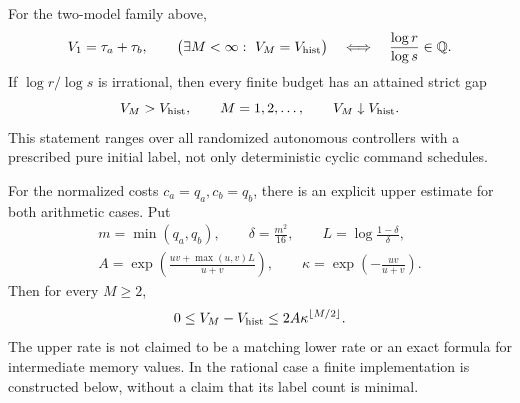 \begin{theorem}
\label{thm:r80-arithmetic-saturation}
For the two-model family above,
\[
 V_1=\tau_a+\tau_b,
 \qquad
 \bigl(\exists M<\infty:\ V_M=V_{\rm hist}\bigr)
       \quad\Longleftrightarrow\quad
                  \frac{\log r}{\log s}\in\mathbb Q.
\]
If $\log r/\log s$ is irrational, then every finite budget has
an attained strict gap
\begin{equation}\label{eq:r80-strict-all-memory}
 V_M>V_{\rm hist},\qquad M=1,2,\ldots,
 \qquad V_M\downarrow V_{\rm hist}.
\end{equation}
This statement ranges over all randomized autonomous controllers
with a prescribed pure initial label, not only deterministic
cyclic command schedules.

For the normalized costs $c_a=q_a,c_b=q_b$, there is an explicit
upper estimate for both arithmetic cases.  Put
\begin{gather*}
 m=\min(q_a,q_b),\qquad \delta=\frac{m^2}{16},\qquad
 L=\log\frac{1-\delta}{\delta},\\
 A=\exp\!\left(\frac{uv+\max(u,v)L}{u+v}\right),
 \qquad \kappa=\exp\!\left(-\frac{uv}{u+v}\right).
\end{gather*}
Then for every $M\ge2$,
\begin{equation}\label{eq:r80-memory-exponential}
 0\le V_M-V_{\rm hist}
                 \le 2A\kappa^{\lfloor M/2\rfloor}.
\end{equation}
The upper rate is not claimed to be a matching lower rate or an
exact formula for intermediate memory values.  In the rational
case a finite implementation is constructed below, without a
claim that its label count is minimal.
\end{theorem}

